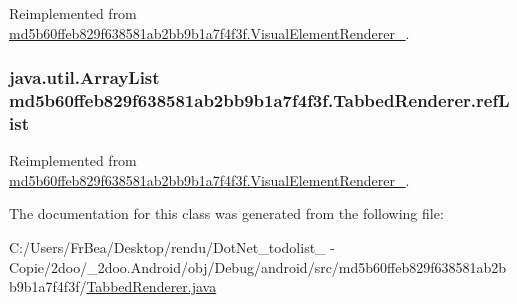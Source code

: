 Reimplemented from \hyperlink{classmd5b60ffeb829f638581ab2bb9b1a7f4f3f_1_1_visual_element_renderer__1_4ef182bc984a4330ed789e1f0b0222d1}{md5b60ffeb829f638581ab2bb9b1a7f4f3f.VisualElementRenderer\_}.\hypertarget{classmd5b60ffeb829f638581ab2bb9b1a7f4f3f_1_1_tabbed_renderer_475c98fea70c5eb38a89991a3bb04f77}{
\subsubsection[{refList}]{\setlength{\rightskip}{0pt plus 5cm}java.util.ArrayList {\bf md5b60ffeb829f638581ab2bb9b1a7f4f3f.TabbedRenderer.refList}}}
\label{classmd5b60ffeb829f638581ab2bb9b1a7f4f3f_1_1_tabbed_renderer_475c98fea70c5eb38a89991a3bb04f77}




Reimplemented from \hyperlink{classmd5b60ffeb829f638581ab2bb9b1a7f4f3f_1_1_visual_element_renderer__1_4ebd0e42ebd360712eb189930036fc9f}{md5b60ffeb829f638581ab2bb9b1a7f4f3f.VisualElementRenderer\_}.

The documentation for this class was generated from the following file:\begin{CompactItemize}
\item 
C:/Users/FrBea/Desktop/rendu/DotNet\_\-todolist\_ - Copie/2doo/\_\-2doo.Android/obj/Debug/android/src/md5b60ffeb829f638581ab2bb9b1a7f4f3f/\hyperlink{_tabbed_renderer_8java}{TabbedRenderer.java}\end{CompactItemize}
